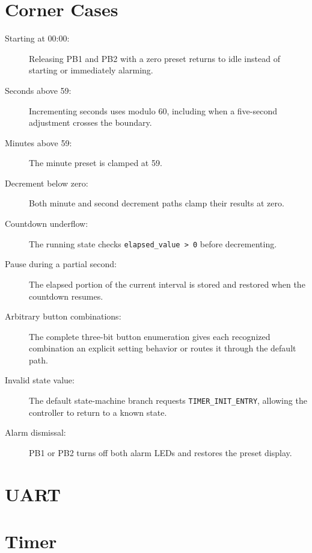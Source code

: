 \documentclass[11pt]{article}
\newcommand{\state}[1]{\texttt{#1}}
\newcommand{\code}[1]{\texttt{#1}}
\begin{document}
\section{Corner Cases}

\begin{description}
    \item[Starting at 00:00:] Releasing PB1 and PB2 with a zero preset returns to idle instead of starting or immediately alarming.

    \item[Seconds above 59:] Incrementing seconds uses modulo 60, including when a five-second adjustment crosses the boundary.

    \item[Minutes above 59:] The minute preset is clamped at 59.

    \item[Decrement below zero:] Both minute and second decrement paths clamp their results at zero.

    \item[Countdown underflow:] The running state checks \code{elapsed\_value > 0} before decrementing.

    \item[Pause during a partial second:] The elapsed portion of the current interval is stored and restored when the countdown resumes.

    \item[Arbitrary button combinations:] The complete three-bit button enumeration gives each recognized combination an explicit setting behavior or routes it through the default path.

    \item[Invalid state value:] The default state-machine branch requests \state{TIMER\_INIT\_ENTRY}, allowing the controller to return to a known state.

    \item[Alarm dismissal:] PB1 or PB2 turns off both alarm LEDs and restores the preset display.
\end{description}



\section{UART}

\section{Timer}
\end{document}
